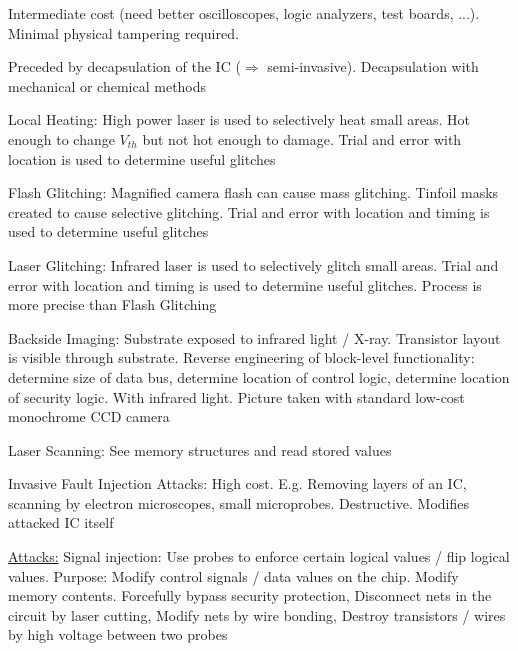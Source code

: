 \documentclass[landscape, a4paper]{article}
\begin{document}
\begin{minipage}[t]{0.2\linewidth}
\begin{betterlist}
		\begin{betterlist}
			\item Intermediate cost (need better oscilloscopes, logic analyzers, test boards, ...). Minimal physical tampering required.
			\item Preceded by decapsulation of the IC ($\Rightarrow$ semi-invasive). Decapsulation with \alert{mechanical} or \alert{chemical} methods
			\item \alert{Local Heating:}  High power laser is used to selectively heat small areas. Hot enough to change $V_{th}$ but not hot enough to damage. Trial and error with location is used to determine useful glitches
			\item \alert{Flash Glitching:} Magnified camera flash can cause mass glitching. Tinfoil masks created to cause selective glitching. Trial and error with location and timing is used to determine useful glitches
			\item \alert{Laser Glitching:} Infrared laser is used to selectively glitch small areas. Trial and error with location and timing is used to determine useful glitches. Process is more precise than Flash Glitching
			\item \alert{Backside Imaging:} Substrate exposed to infrared light / X-ray. Transistor layout is visible through substrate. Reverse engineering of block-level functionality: determine size of data bus, determine location of control logic, determine location of security logic. With infrared light. Picture taken with standard low-cost monochrome CCD camera
			\item \alert{Laser Scanning:} See memory structures and read stored values
		\end{betterlist}
		\item \alert{Invasive Fault Injection Attacks:} High cost. E.g. Removing layers of an IC, scanning by electron microscopes, small microprobes. Destructive. Modifies attacked IC itself
		\begin{betterlist}
			\item \underline{Attacks:} \alert{Signal injection:} Use probes to enforce certain logical values / flip logical values. Purpose: Modify control signals / data values on the chip. Modify memory contents. Forcefully bypass security protection, \alert{Disconnect nets in the circuit by laser cutting}, \alert{Modify nets by wire bonding}, \alert{Destroy transistors / wires by high voltage between two probes}
		\end{betterlist}
	\end{betterlist}
\end{minipage}
\end{document}
